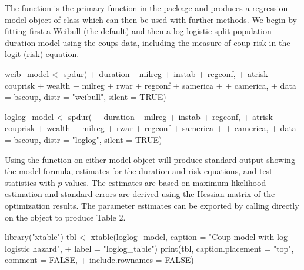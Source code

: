 The  function is the primary function in the package and
produces a regression model object of class  which can then
be used with further methods. We begin by fitting first a Weibull (the default) and
then a log-logistic split-population duration model using the coups
data, including the measure of coup risk in the logit (risk) equation.

\begin{example}
  weib_model <- spdur(
  +    duration ~ milreg + instab + regconf,
  +    atrisk ~ couprisk + wealth + milreg + rwar + regconf + samerica + 
  +      camerica,
  +    data = bscoup, distr = "weibull", silent = TRUE)

  loglog_model <- spdur(
  +    duration ~ milreg + instab + regconf,
  +    atrisk ~ couprisk + wealth + milreg + rwar + regconf + samerica + 
  +      camerica,
  +    data = bscoup, distr = "loglog", silent = TRUE)
\end{example}

Using the  function on either model object will produce
standard output showing the model formula, estimates for the duration
and risk equations, and test statistics with \(p\)-values. The estimates are based on maximum likelihood estimation and standard errors are derived using the Hessian matrix of the optimization results. The  parameter estimates can be
exported by calling \citep[see][]{dahl2016xtable} directly on the  object to
produce Table 2.

\begin{example}
  library("xtable")
  tbl <- xtable(loglog_model, caption = "Coup model with log-logistic hazard",
  +    label = "loglog_table")
  print(tbl, caption.placement = "top", comment = FALSE, 
  +    include.rownames = FALSE)
\end{example}


